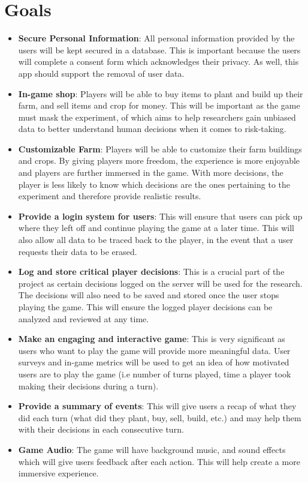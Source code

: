 \documentclass{article}
\begin{document}
\section{Goals}
    \begin{itemize}
        \item \textbf{Secure Personal Information}: All personal information provided by the users will be kept secured in a database. This is important because the users will complete a consent form which acknowledges their privacy. As well, this app should support the removal of user data. 
        \item \textbf{In-game shop}: Players will be able to buy items to plant and build up their farm, and sell items and crop for money. This will be important as the game must mask the experiment, of which aims to help researchers gain unbiased data to better understand human decisions when it comes to risk-taking.
        \item \textbf{Customizable Farm}: Players will be able to customize their farm buildings and crops. By giving players more freedom, the experience is more enjoyable and players are further immersed in the game. With more decisions, the player is less likely to know which decisions are the ones pertaining to the experiment and therefore provide realistic results.
        \item \textbf{Provide a login system for users}: This will ensure that users can pick up where they left off and continue playing the game at a later time. This will also allow all data to be traced back to the player, in the event that a user requests their data to be erased.
        \item \textbf{Log and store critical player decisions}: This is a crucial part of the project as certain decisions logged on the server will be used for the research. The decisions will also need to be saved and stored once the user stops playing the game. This will ensure the logged player decisions can be analyzed and reviewed at any time.
        \item \textbf{Make an engaging and interactive game}: This is very significant as users who want to play the game will provide more meaningful data. User surveys and in-game metrics will be used to get an idea of how motivated users are to play the game (i.e number of turns played, time a player took making their decisions during a turn).
        \item \textbf{Provide a summary of events}: This will give users a recap of what they did each turn (what did they plant, buy, sell, build, etc.) and may help them with their decisions in each consecutive turn. 
        \item \textbf{Game Audio}: The game will have background music, and sound effects which will give users feedback after each action. This will help create a more immersive experience.
    \end{itemize}
\end{document}
